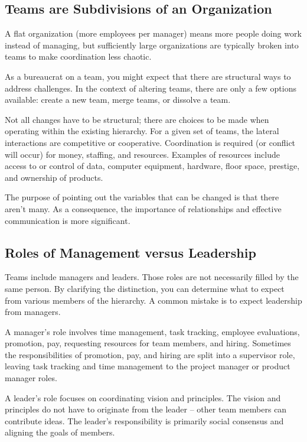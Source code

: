 

\subsection*{Teams are Subdivisions of an Organization}

A flat organization (more employees per manager) means more people doing work instead of managing, but sufficiently large organizations are typically broken into teams to make coordination less chaotic. 


As a bureaucrat on a team, you might expect that there are structural ways to address challenges. 
In the context of altering teams, there are only a few options available: create a new team, merge teams, or dissolve a team. 

Not all changes have to be structural; there are choices to be made when operating within the existing hierarchy.
For a given set of teams, the lateral interactions are competitive or cooperative. Coordination is required (or conflict will occur) for money, staffing, and resources. Examples of resources include access to or control of data, computer equipment, hardware, floor space, prestige, and ownership of products.

The purpose of pointing out the variables that can be changed is that there aren't many. As a consequence, the importance of  relationships and effective communication is more significant. 

\subsection*{Roles of Management versus Leadership}

Teams include managers and leaders. Those roles are not necessarily filled by the same person. By clarifying the distinction, you can determine what to expect from various members of the hierarchy. A common mistake is to expect leadership from managers. 

A manager's role involves time management, task tracking, employee evaluations, promotion, pay, requesting resources for team members, and hiring. Sometimes the responsibilities of promotion, pay, and hiring are split into a supervisor role, leaving task tracking and time management to the project manager or product manager roles.

A leader's role focuses on coordinating vision and principles. The vision and principles do not have to originate from the leader -- other team members can contribute ideas. The leader's responsibility is primarily social consensus and aligning the goals of members. 
